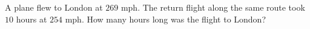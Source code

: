 A plane flew to London at $269$ mph. The return flight along the same route took $10$ hours at $254$ mph. How many hours long was the flight to London?

